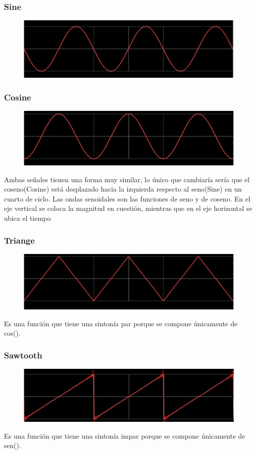 \documentclass[../main.tex]{subfiles}
\begin{document}
	\subsubsection{Sine}
	\begin{figure}[H]
		\includegraphics[width= 0.6 \textwidth]{imagen2.png}
		\centering
	\end{figure}

	\subsubsection{Cosine}
	\begin{figure}[H]
		\includegraphics[width= 0.6 \textwidth]{imagen3.png}
		\centering
	\end{figure}
	Ambas señales tienen una forma muy similar, lo único que cambiaría sería que el 
	coseno(Cosine) está desplazado hacia la izquierda respecto al seno(Sine) 
	en un cuarto de ciclo. Las ondas senoidales son las funciones de seno y de coseno.
	En el eje vertical se coloca la magnitud en cuestión, mientras que en el
	eje horizontal se ubica el tiempo

	\subsubsection{Triange}
	\begin{figure}[H]
		\includegraphics[width= 0.6 \textwidth]{imagen4.png}
		\centering
	\end{figure}
	Es una función que tiene una sintonía par porque se compone únicamente de cos().

	\subsubsection{Sawtooth}
	\begin{figure}[H]
		\includegraphics[width= 0.6 \textwidth]{imagen5.png}
		\centering
	\end{figure}
	Es una función que tiene una sintonía impar porque se compone únicamente de sen().
\end{document}

